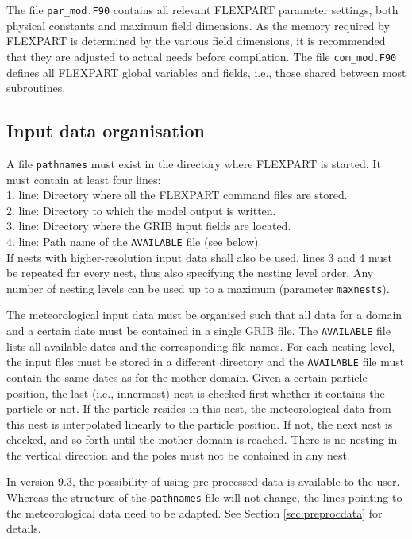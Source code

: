 \documentclass{egu}                  %
\begin{document}
The file \verb|par_mod.F90| contains all relevant FLEXPART parameter settings,
both physical constants and maximum field dimensions.  As the memory required
by FLEXPART is determined by the various field dimensions, it is recommended
that they are adjusted to actual needs before compilation.  The file
\verb|com_mod.F90| defines all FLEXPART global variables and fields, i.e., those
shared between most subroutines.


\subsection{Input data organisation}

A file \verb|pathnames| must exist in the directory where FLEXPART is started.
It must contain at least four lines:\\ 1.  line: Directory where all the
FLEXPART command files are stored.\\ 2.  line: Directory to which the model
output is written.\\ 3.  line: Directory where the GRIB input fields are
located.\\ 4.  line: Path name of the \verb|AVAILABLE| file (see below).\\ If
nests with higher-resolution input data shall also be used, lines 3 and 4 must
be repeated for every nest, thus also specifying the nesting level order.  Any
number of nesting levels can be used up to a maximum (parameter
\verb|maxnests|). 

The meteorological input data must be organised such that all data for a domain
and a certain date must be contained in a single GRIB file.  The
\verb|AVAILABLE| file lists all available dates and the corresponding file
names. For each nesting level, the input files must be stored in a different
directory and the \verb|AVAILABLE| file must contain the same dates as for the
mother domain.  Given a certain particle position, the last (i.e., innermost)
nest is checked first whether it contains the particle or not.  If the particle
resides in this nest, the meteorological data from this nest is interpolated
linearly to the particle position.  If not, the next nest is checked, and so
forth until the mother domain is reached.  There is no nesting in the vertical
direction and the poles must not be contained in any nest.

In version 9.3, the possibility of using pre-processed data is available to the user. Whereas the structure of the \verb|pathnames| file will not change, the lines pointing to the meteorological data need to be adapted. See Section \ref{sec:preprocdata} for details.
\end{document}
